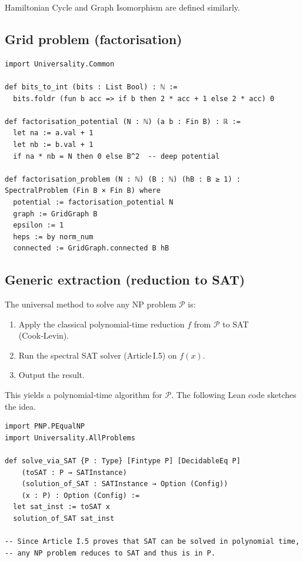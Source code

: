 \documentclass[11pt,a4paper]{article}
\begin{document}
Hamiltonian Cycle and Graph Isomorphism are defined similarly.

\subsection{Grid problem (factorisation)}

\begin{lstlisting}[style=lean, caption={Universality/Factorisation.lean}]
import Universality.Common

def bits_to_int (bits : List Bool) : ℕ :=
  bits.foldr (fun b acc => if b then 2 * acc + 1 else 2 * acc) 0

def factorisation_potential (N : ℕ) (a b : Fin B) : ℝ :=
  let na := a.val + 1
  let nb := b.val + 1
  if na * nb = N then 0 else B^2  -- deep potential

def factorisation_problem (N : ℕ) (B : ℕ) (hB : B ≥ 1) : SpectralProblem (Fin B × Fin B) where
  potential := factorisation_potential N
  graph := GridGraph B
  epsilon := 1
  heps := by norm_num
  connected := GridGraph.connected B hB
\end{lstlisting}

\subsection{Generic extraction (reduction to SAT)}

The universal method to solve any NP problem $\mathcal{P}$ is:
\begin{enumerate}
\item Apply the classical polynomial‑time reduction $f$ from $\mathcal{P}$ to SAT (Cook‑Levin).
\item Run the spectral SAT solver (Article I.5) on $f(x)$.
\item Output the result.
\end{enumerate}
This yields a polynomial‑time algorithm for $\mathcal{P}$. The following Lean code sketches the idea.

\begin{lstlisting}[style=lean, caption={Universality/Reduction.lean}]
import PNP.PEqualNP
import Universality.AllProblems

def solve_via_SAT {P : Type} [Fintype P] [DecidableEq P]
    (toSAT : P → SATInstance)
    (solution_of_SAT : SATInstance → Option (Config))
    (x : P) : Option (Config) :=
  let sat_inst := toSAT x
  solution_of_SAT sat_inst

-- Since Article I.5 proves that SAT can be solved in polynomial time,
-- any NP problem reduces to SAT and thus is in P.
\end{lstlisting}
\end{document}
